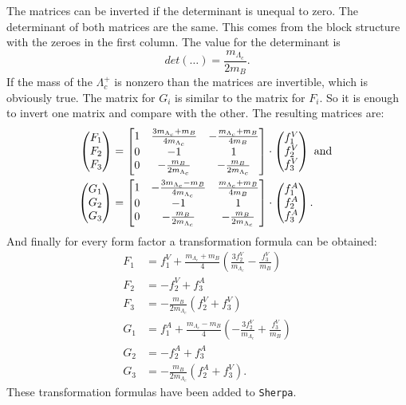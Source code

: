 The matrices can be inverted if the determinant is unequal to zero. The 
determinant of both matrices are the same. This comes from the block 
structure with the zeroes in the first column. The value for the determinant is
\begin{equation}
  det (\dots) = \frac{m_{\Lambda_c}}{2 m_B}. \label{eq:det}
\end{equation}
If the mass of the \(\Lambda_c^+\) is nonzero than the matrices are invertible, which is 
obviously true. The matrix for \(G_i\) is similar to the matrix for \(F_i\). So it is 
enough to invert one matrix and compare with the other. The resulting matrices are:
\begin{align}
  \Spvek{F_1; F_2; F_3} & =
  \begin{bmatrix}
    1 & \frac{3 m_{\Lambda_c} + m_B }{4 m_{\Lambda_c}} & -\frac{m_{\Lambda_c} + m_B }{4 m_B} \\
    0 & -1 & 1 \\
    0 & -\frac{m_B}{2 m_{\Lambda_c}} & -\frac{m_B}{2 m_{\Lambda_c}} \\
  \end{bmatrix}
  \cdot \Spvek{f^V_1; f^V_2; f^V_3} \nonumber \text{ and }\\
  \Spvek{G_1; G_2; G_3} & =
  \begin{bmatrix}
    1 & -\frac{3 m_{\Lambda_c} - m_B }{4 m_{\Lambda_c}} & \frac{m_{\Lambda_c} + m_B }{4 m_B} \\
    0 & -1 & 1 \\
    0 & -\frac{m_B}{2 m_{\Lambda_c}} & -\frac{m_B}{2 m_{\Lambda_c}} \\
  \end{bmatrix}
  \cdot \Spvek{f^A_1; f^A_2; f^A_3}. \label{eq:finmat}
\end{align}
And finally for every form factor a transformation formula can be obtained:
\begin{align}
  F_1 & = f^V_1 + \frac{m_{\Lambda_c} + m_B }{4} \left( \frac{3 f^V_2}{m_{\Lambda_c}} - \frac{f^V_3}{m_B} \right) \nonumber \\
  F_2 & = - f^V_2 + f^A_3 \nonumber \\
  F_3 & = - \frac{m_B}{2 m_{\Lambda_c}} \left(f^V_2 + f^V_3 \right) \nonumber \\
  G_1 & = f^A_1 + \frac{m_{\Lambda_c} - m_B }{4} \left( - \frac{3 f^V_2}{m_{\Lambda_c}} + \frac{f^V_3}{m_B} \right) \nonumber \\
  G_2 & = - f^A_2 + f^A_3 \nonumber \\
  G_3 & = - \frac{m_B}{2 m_{\Lambda_c}} \left(f^A_2 + f^V_3 \right). \label{eq:fintrans}
\end{align}
These transformation formulas have been added to \texttt{Sherpa}.

